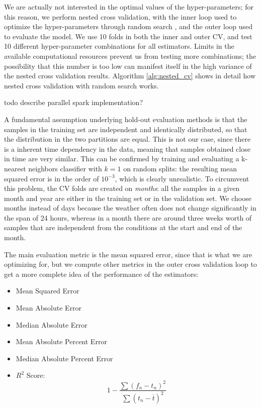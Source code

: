 \documentclass[12pt]{book}
\begin{document}
We are actually not interested in the optimal values of the hyper-parameters; for this reason, we perform nested cross validation, with the inner loop used to optimize the hyper-parameters through random search \citep{random_search}, and the outer loop used to evaluate the model. We use 10 folds in both the inner and outer CV, and test 10 different hyper-parameter combinations for all estimators. Limits in the available computational resources prevent us from testing more combinations; the possibility that this number is too low can manifest itself in the high variance of the nested cross validation results. Algorithm \ref{alg:nested_cv} shows in detail how nested cross validation with random search works.

todo describe parallel spark implementation?

A fundamental assumption underlying hold-out evaluation methods is that the samples in the training set are independent and identically distributed, so that the distribution in the two partitions are equal. This is not our case, since there is a inherent time dependency in the data, meaning that samples obtained close in time are very similar. This can be confirmed by training and evaluating a k-nearest neighbors classifier with $k=1$ on random splits: the resulting mean squared error is in the order of $10^{-3}$, which is clearly unrealistic. To circumvent this problem, the CV folds are created on \emph{months}: all the samples in a given month and year are either in the training set or in the validation set. We choose months instead of days because the weather often does not change significantly in the span of 24 hours, whereas in a month there are around three weeks worth of samples that are independent from the conditions at the start and end of the month.

The main evaluation metric is the mean squared error, since that is what we are optimizing for, but we compute other metrics in the outer cross validation loop to get a more complete idea of the performance of the estimators:

\begin{itemize}
\item Mean Squared Error
\item Mean Absolute Error
\item Median Absolute Error
\item Mean Absolute Percent Error
\item Median Absolute Percent Error
\item $R^2$ Score:
$$
1-\frac{\sum (f_n-t_n)^2}{\sum (t_n-\overline{t})^2}
$$
\end{itemize}
\end{document}
